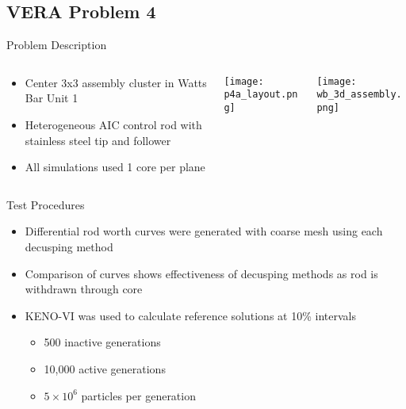 \subsection{VERA Problem 4}
\begin{frame}[t]{Problem Description}
    
\begin{columns}
    \begin{column}{0.5\textwidth}
        \begin{itemize}
            \item Center 3x3 assembly cluster in Watts Bar Unit 1
            \item Heterogeneous AIC control rod with stainless steel tip and \bfc{} follower
            \item All simulations used 1 core per plane
        \end{itemize}
    \end{column}
    \begin{column}{0.28\textwidth}
        \texttt{[image: p4a\_layout.png]}
    \end{column}
    \begin{column}{0.22\textwidth}
        \texttt{[image: wb\_3d\_assembly.png]}
\end{column}
\end{columns}
    
\end{frame}


\begin{frame}[t]{Test Procedures}
    
    \begin{itemize}
        \item Differential rod worth curves were generated with coarse mesh using each decusping method
        \item Comparison of curves shows effectiveness of decusping methods as rod is withdrawn through core
        \item KENO-VI was used to calculate reference solutions at 10\% intervals
        \begin{itemize}
            \item 500 inactive generations
            \item 10,000 active generations
            \item $5\times 10^6$ particles per generation
        \end{itemize}
    \end{itemize}

\end{frame}

